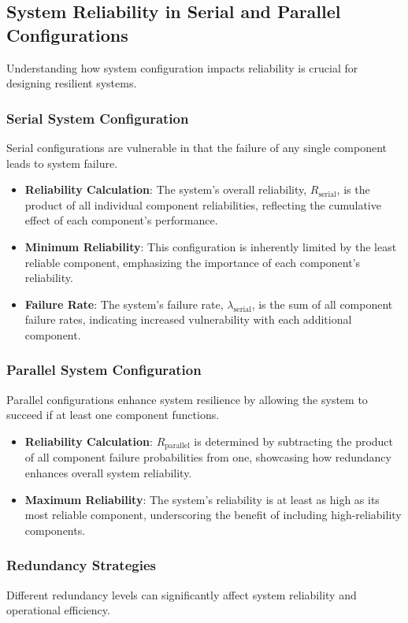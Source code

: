 \subsection*{System Reliability in Serial and Parallel Configurations}
Understanding how system configuration impacts reliability is crucial for designing resilient systems.

\subsubsection*{Serial System Configuration}
Serial configurations are vulnerable in that the failure of any single component leads to system failure.
\begin{itemize}
    \item \textbf{Reliability Calculation}: The system's overall reliability, \( R_{\text{serial}} \), is the product of all individual component reliabilities, reflecting the cumulative effect of each component's performance.
    \item \textbf{Minimum Reliability}: This configuration is inherently limited by the least reliable component, emphasizing the importance of each component's reliability.
    \item \textbf{Failure Rate}: The system's failure rate, \( \lambda_{\text{serial}} \), is the sum of all component failure rates, indicating increased vulnerability with each additional component.
\end{itemize}

\subsubsection*{Parallel System Configuration}
Parallel configurations enhance system resilience by allowing the system to succeed if at least one component functions.
\begin{itemize}
    \item \textbf{Reliability Calculation}: \( R_{\text{parallel}} \) is determined by subtracting the product of all component failure probabilities from one, showcasing how redundancy enhances overall system reliability.
    \item \textbf{Maximum Reliability}: The system's reliability is at least as high as its most reliable component, underscoring the benefit of including high-reliability components.
\end{itemize}

\subsubsection*{Redundancy Strategies}
Different redundancy levels can significantly affect system reliability and operational efficiency.

